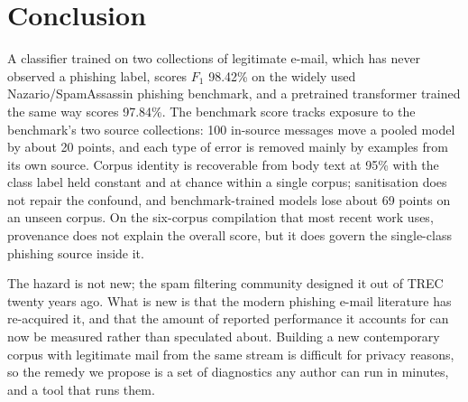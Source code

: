 \documentclass[twoside,11pt]{article}
\begin{document}
\section{Conclusion}

A classifier trained on two collections of legitimate e-mail, which has never
observed a phishing label, scores $F_1$ 98.42\% on the widely used
Nazario/SpamAssassin phishing benchmark, and a pretrained transformer trained
the same way scores 97.84\%. The benchmark score tracks exposure to the
benchmark's two source collections: 100 in-source messages move a pooled
model by about 20 points, and each type of error is removed mainly by examples
from its own source. Corpus identity is recoverable from body text at 95\% with
the class label held constant and at chance within a single corpus;
sanitisation does not repair the confound, and benchmark-trained models lose
about 69 points on an unseen corpus. On the six-corpus compilation that most recent work
uses, provenance does not explain the overall score, but it does govern the
single-class phishing source inside it.

The hazard is not new; the spam filtering community designed it out of TREC
twenty years ago. What is new is that the modern phishing e-mail literature
has re-acquired it, and that the amount of reported performance it accounts
for can now be measured rather than speculated about. Building a new
contemporary corpus with legitimate mail from the same stream is difficult for
privacy reasons, so the remedy we propose is a set of diagnostics any author
can run in minutes, and a tool that runs them.

\end{document}
